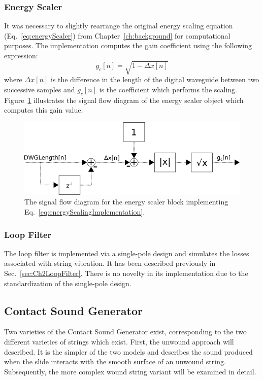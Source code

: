 \documentclass[../main.tex]{subfiles}
\begin{document}
\subsubsection{Energy Scaler}
It was necessary to slightly rearrange the original energy scaling equation (Eq.~\ref{eq:energyScaler}) from Chapter~\ref{ch:background} for computational purposes. The implementation computes the gain coefficient using the following expression:
\begin{equation}
    \label{eq:energyScalingImplementation}
    g_c[n] = \sqrt{1-\Delta x[n]}
\end{equation}
where $\Delta x[n]$ is the difference in the length of the digital waveguide between two successive samples and $g_c[n]$ is the coefficient which performs the scaling. Figure~\ref{fig:energyScaler} illustrates the signal flow diagram of the energy scaler object which computes this gain value.
\begin{figure}[h]
    \centering
    \includegraphics[scale=.5]{./images/diagrams/energyScaler.png}
    \caption{The signal flow diagram for the energy scaler block implementing Eq.~\ref{eq:energyScalingImplementation}.}
    \label{fig:energyScaler}
\end{figure}

\subsubsection{Loop Filter}
The loop filter is implemented via a single-pole design and simulates the losses associated with string vibration. It has been described previously in Sec.~\ref{sec:Ch2LoopFilter}. There is no novelty in its implementation due to the standardization of the single-pole design.

\subsection{Contact Sound Generator}
Two varieties of the Contact Sound Generator exist, corresponding to the two different varieties of strings which exist. First, the unwound approach will described. It is the simpler of the two models and describes the sound produced when the slide interacts with the smooth surface of an unwound string. Subsequently, the more complex wound string variant will be examined in detail.
\end{document}
